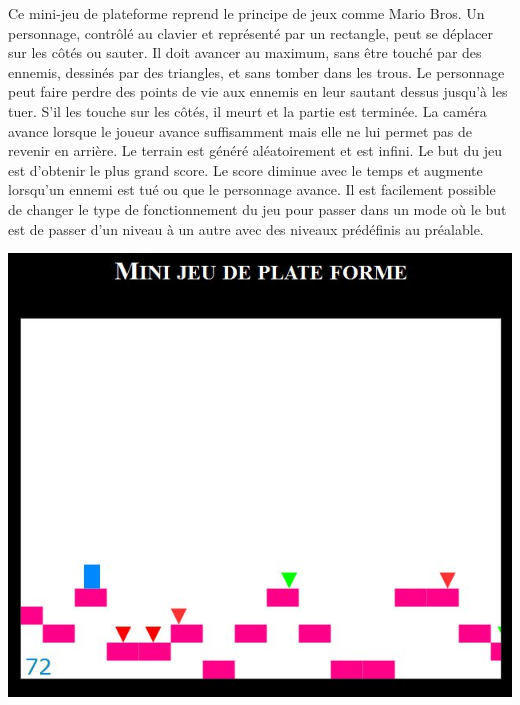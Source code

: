 \begin{minipage}{9cm}
Ce mini-jeu de plateforme reprend le principe de jeux comme Mario Bros.
Un personnage, contrôlé au clavier et représenté par un rectangle, peut se déplacer sur les côtés ou sauter.
Il doit avancer au maximum, sans être touché par des ennemis, dessinés par des triangles, et sans tomber dans les trous.
Le personnage peut faire perdre des points de vie aux ennemis en leur sautant dessus jusqu'à les tuer. 
S'il les touche sur les côtés, il meurt et la partie est terminée.
La caméra avance lorsque le joueur avance suffisamment mais elle ne lui permet pas de revenir en arrière.
Le terrain est généré aléatoirement et est infini.
Le but du jeu est d'obtenir le plus grand score. Le score diminue avec le temps et augmente lorsqu'un ennemi est tué ou que le personnage avance.
Il est facilement possible de changer le type de fonctionnement du jeu pour passer dans un mode où le but est de passer d'un niveau à un autre
avec des niveaux prédéfinis au préalable.
\end{minipage}
\hfill
\begin{minipage}{6cm}
 \includegraphics[width=\linewidth]{img/capturejeu_mario}
\end{minipage}


